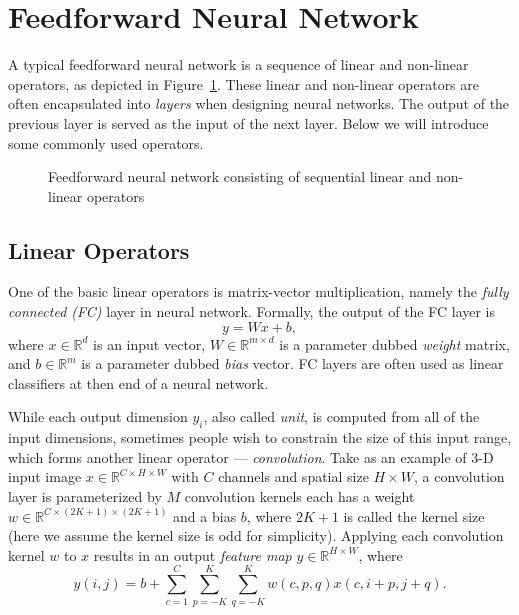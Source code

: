 \section{Feedforward Neural Network} %
\label{sec:dl-feedforward}
A typical feedforward neural network is a sequence of linear and non-linear operators, as depicted in Figure~\ref{fig:dl-feedforward}. These linear and non-linear operators are often encapsulated into \emph{layers} when designing neural networks. The output of the previous layer is served as the input of the next layer. Below we will introduce some commonly used operators.
\begin{figure}[t]
\begin{center}
\fbox{\rule{0pt}{2in} \rule{0.9\linewidth}{0pt}}
\caption{Feedforward neural network consisting of sequential linear and non-linear operators}
\label{fig:dl-feedforward}
\end{center}
\end{figure}

\subsection{Linear Operators} %
\label{sub:dl-linops}
One of the basic linear operators is matrix-vector multiplication, namely the \emph{fully connected (FC)} layer in neural network. Formally, the output of the FC layer is
\begin{equation}
  y=Wx+b,
\end{equation}
where $x\in\mathbb{R}^d$ is an input vector, $W\in\mathbb{R}^{m\times d}$ is a parameter dubbed \emph{weight} matrix, and $b\in\mathbb{R}^m$ is a parameter dubbed \emph{bias} vector. FC layers are often used as linear classifiers at then end of a neural network.

While each output dimension $y_i$, also called \emph{unit}, is computed from all of the input dimensions, sometimes people wish to constrain the size of this input range, which forms another linear operator --- \emph{convolution}. Take as an example of 3-D input image $x\in\mathbb{R}^{C\times H\times W}$ with $C$ channels and spatial size $H\times W$, a convolution layer is parameterized by $M$ convolution kernels each has a weight $w\in\mathbb{R}^{C\times (2K+1)\times (2K+1)}$ and a bias $b$, where $2K+1$ is called the kernel size (here we assume the kernel size is odd for simplicity). Applying each convolution kernel $w$ to $x$ results in an output \emph{feature map} $y\in\mathbb{R}^{H\times W}$, where
\begin{equation}
  y(i,j) = b + \sum_{c=1}^C \sum_{p=-K}^K \sum_{q=-K}^K w(c,p,q) x(c,i+p,j+q).
\end{equation}

